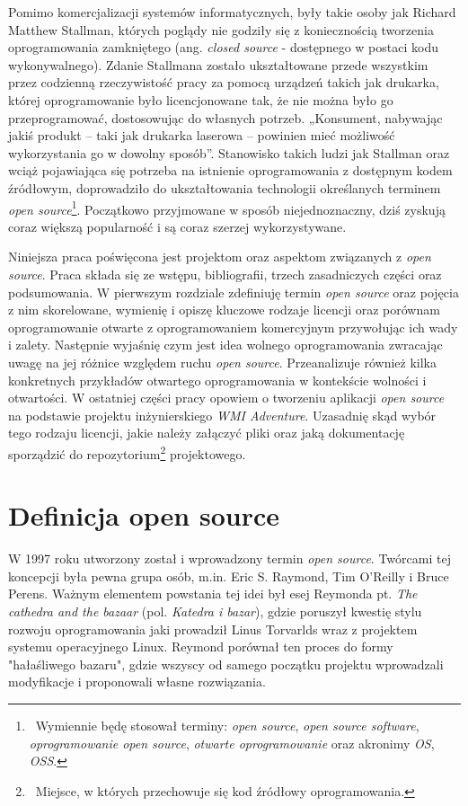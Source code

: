 \documentclass{article}
\begin{document}
Pomimo komercjalizacji systemów informatycznych, były takie osoby jak Richard Matthew Stallman, których poglądy nie godziły się z koniecznością tworzenia oprogramowania zamkniętego (ang. \emph{closed source} - dostępnego w postaci kodu wykonywalnego). Zdanie Stallmana zostało ukształtowane przede wszystkim przez codzienną rzeczywistość pracy za pomocą urządzeń takich jak drukarka, której oprogramowanie było licencjonowane tak, że nie można było go przeprogramować, dostosowując do własnych potrzeb. „Konsument, nabywając jakiś produkt – taki jak drukarka laserowa – powinien mieć możliwość wykorzystania go w dowolny sposób”\cite{Kotula}. Stanowisko takich ludzi jak Stallman oraz wciąż pojawiająca się potrzeba na istnienie oprogramowania z dostępnym kodem źródłowym, doprowadziło do ukształtowania technologii określanych terminem \emph{open source}\footnote{\, Wymiennie będę stosował terminy: \emph{open source}, \emph{open source software}, \emph{oprogramowanie open source}, \emph{otwarte oprogramowanie} oraz akronimy \emph{OS}, \emph{OSS}.}. Początkowo przyjmowane w sposób niejednoznaczny, dziś zyskują coraz większą popularność i są coraz szerzej wykorzystywane\cite{Kotula}. 

Niniejsza praca poświęcona jest projektom oraz aspektom związanych z \emph{open source}. Praca składa się ze wstępu, bibliografii, trzech zasadniczych części oraz podsumowania. W pierwszym rozdziale zdefiniuję termin \emph{open source} oraz pojęcia z nim skorelowane, wymienię i opiszę kluczowe rodzaje licencji oraz porównam oprogramowanie otwarte z oprogramowaniem komercyjnym przywołując ich wady i zalety. Następnie wyjaśnię czym jest idea wolnego oprogramowania zwracając uwagę na jej różnice względem ruchu \emph{open source}. Przeanalizuje również kilka konkretnych przykładów otwartego oprogramowania w kontekście wolności i otwartości. W ostatniej części pracy opowiem o tworzeniu aplikacji \emph{open source} na podstawie projektu inżynierskiego \emph{WMI Adventure}. Uzasadnię skąd wybór tego rodzaju licencji, jakie należy załączyć pliki oraz jaką dokumentację sporządzić do repozytorium\footnote{\, Miejsce, w których przechowuje się kod źródłowy oprogramowania.} projektowego.

\section{Definicja open source}

\hspace{4mm} W 1997 roku utworzony został i wprowadzony termin \emph{open source}. Twórcami tej koncepcji była pewna grupa osób, m.in. Eric S. Raymond, Tim O'Reilly i Bruce Perens. Ważnym elementem powstania tej idei był esej Reymonda pt. \emph{The cathedra and the bazaar} (pol. \emph{Katedra i bazar}), gdzie poruszył kwestię stylu rozwoju oprogramowania jaki prowadził Linus Torvarlds wraz z projektem systemu operacyjnego Linux. Reymond porównał ten proces do formy "hałaśliwego bazaru", gdzie wszyscy od samego początku projektu wprowadzali modyfikacje i proponowali własne rozwiązania\cite{Kotula}.  
\end{document}
